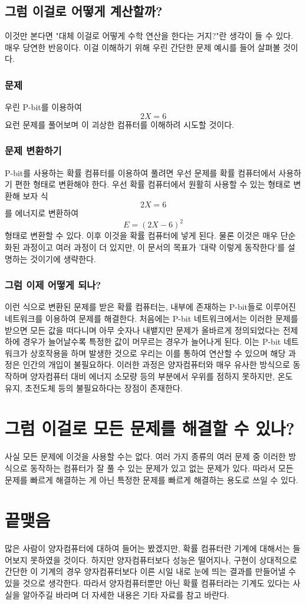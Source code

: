 \documentclass{article}
\begin{document}
	\subsection{그럼 이걸로 어떻게 계산할까?}
	이것만 본다면 "대체 이걸로 어떻게 수학 연산을 한다는 거지?"란 생각이 들 수 있다. 매우 당연한 반응이다. 이걸 이해하기 위해 우린 간단한 문제 예시를 들어 살펴볼 것이다.
	\subsubsection{문제}
	우린 P-bit를 이용하여 
	$$2X = 6$$
	요런 문제를 풀어보며 이 괴상한 컴퓨터를 이해하려 시도할 것이다.	
	\subsubsection{문제 변환하기}
	P-bit를 사용하는 확률 컴퓨터를 이용하여 풀려면 우선 문제를 확률 컴퓨터에서 사용하기 편한 형태로 변환해야 한다. 우선 확률 컴퓨터에서 원활히 사용할 수 있는 형태로 변환해 보자
	\newline
	\newline
	식
	$$
	2X = 6
	$$
	를 에너지로 변환하여
	$$
	E = (2X-6)^2
	$$
	형태로 변환할 수 있다. 이후 이것을 확률 컴퓨터에 넣게 된다. 물론 이것은 매우 단순화된 과정이고 여러 과정이 더 있지만, 이 문서의 목표가 '대략 이렇게 동작한다'를 설명하는 것이기에 생략한다.
	\subsubsection{그럼 이제 어떻게 되나?}
	이런 식으로 변환된 문제를 받은 확률 컴퓨터는, 내부에 존재하는 P-bit들로 이루어진 네트워크를 이용하여 문제를 해결한다. 처음에는 P-bit 네트워크에서는 이러한 문제를 받으면 모든 값을 떠다니며 아무 숫자나 내뱉지만 문제가 올바르게 정의되었다는 전제하에 경우가 늘어날수록 특정한 값이 머무르는 경우가 늘어나게 된다. 이는 P-bit 네트워크가 상호작용을 하며 발생한 것으로 우리는 이를 통하여 연산할 수 있으며 해당 과정은 인간의 개입이 불필요하다. 이러한 과정은 양자컴퓨터와 매우 유사한 방식으로 동작하며 양자컴퓨터 대비 에너지 소모량 등의 부분에서 우위를 점하지 못하지만, 온도 유지, 초전도체 등의 불필요하다는 장점이 존재한다.
	\section{그럼 이걸로 모든 문제를 해결할 수 있나?}
	사실 모든 문제에 이것을 사용할 수는 없다. 여러 가지 종류의 여러 문제 중 이러한 방식으로 동작하는 컴퓨터가 잘 풀 수 있는 문제가 있고 없는 문제가 있다. 따라서 모든 문제를 빠르게 해결하는 게 아닌 특정한 문제를 빠르게 해결하는 용도로 쓰일 수 있다.
	\section{끝맺음}
	많은 사람이 양자컴퓨터에 대하여 들어는 봤겠지만, 확률 컴퓨터란 기계에 대해서는 들어보지 못하였을 것이다. 하지만 양자컴퓨터보다 성능은 떨어지나, 구현이 상대적으로 간단한 이 기계의 경우 양자컴퓨터보다 이른 시일 내로 눈에 띄는 결과를 만들어낼 수 있을 것으로 생각한다. 따라서 양자컴퓨터뿐만 아닌 확률 컴퓨터라는 기계도 있다는 사실을 알아주길 바라며 더 자세한 내용은 기타 자료를 참고 바란다.
\end{document}
